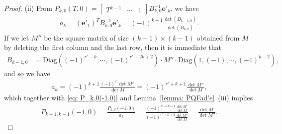 \documentclass[11pt]{amsart}
\theoremstyle{definition}
\numberwithin{equation}{subsection}
\theoremstyle{plain}
\theoremstyle{plain}
\theoremstyle{plain}
\theoremstyle{plain}
\theoremstyle{plain}
\theoremstyle{plain}
\theoremstyle{plain}
\theoremstyle{plain}
\theoremstyle{plain}
\theoremstyle{plain}
\theoremstyle{plain}
\theoremstyle{plain}
\theoremstyle{definition}
\theoremstyle{definition}
\theoremstyle{definition}
\theoremstyle{remark}
\renewcommand{\(}{\textup{(}}
\renewcommand{\)}{\textup{)}}
\begin{document}
\begin{proof}
(ii) From $P_{k,0}(T,0)=
        \begin{bmatrix}
            T^{k-1} & \cdots & 1
        \end{bmatrix}
        B_{k,0}^{-1}
        \mathbf{e}'_k$, we have
\begin{align*}
        a_k
        =(\mathbf{e}'_1)^T B_{k,0}^{-1} \mathbf{e}'_k
        =(-1)^{k+1}\frac{\det(B_{k-1,0})}{\det(B_{k,0})}.
\end{align*}
If we let $M''$ be the square matrix of size $(k-1)\times (k-1)$ obtained from $M$ by deleting the first column and the last row, then it is immediate that
\begin{align*}
        B_{k-1,0}
        &=\mathrm{Diag}((-1)^{r'-k},\cdots, (-1)^{r'-2k+2})
        \cdot
        M''
        \cdot
        \mathrm{Diag}(1,(-1),\cdots,(-1)^{k-2}),
\end{align*}
and so we have
\begin{align*}
        a_k=(-1)^{k+1}\frac{(-1)^{r'}\det M''}{\det M}
        =(-1)^{r'+k+1}\frac{\det M''}{\det M},
\end{align*}
which together with \eqref{eq: P_k,0(-1,0)} and Lemma~\ref{lemma: PQFad'e}~(iii) implies
\begin{align*}
        P_{k-1,k-1}(-1,0)
        =\frac{P_{k,0}(-1,0)}{a_k}
        =\frac{(-1)^{r'-k-1}\frac{\det M'}{\det M}}{(-1)^{r'+k+1}\frac{\det M''}{\det M}}
        =\frac{\det M'}{\det M''}.
\end{align*}


\end{proof}
\end{document}

